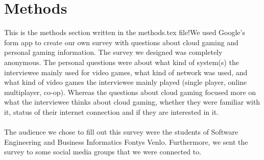 \section{Methods}
This is the methods section written in the methods.tex file!We used Google's form app to create our own survey with questions about cloud gaming and personal gaming information. The survey we designed was completely anonymous. The personal questions were about what kind of system(s) the interviewee mainly used for video games, what kind of network was used, and what kind of video games the interviewee mainly played (single player, online multiplayer, co-op). Whereas the questions about cloud gaming focused more on what the interviewee thinks about cloud gaming, whether they were familiar with it, status of their internet connection and if they are interested in it.
\\\\
The audience we chose to fill out this survey were the students of Software Engineering and Business Informatics Fontys Venlo. Furthermore, we sent the survey to some social media groups that we were connected to.